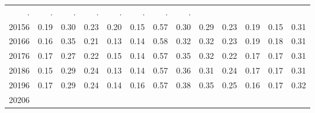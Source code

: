 \begin{table}[!h]
\begin{tabular}{lllllllllllll}
  \multicolumn{1}{r}{.} &
  \multicolumn{1}{r}{.} &
  \multicolumn{1}{r}{.} &
  \multicolumn{1}{r}{.} &
  \multicolumn{1}{r}{.} &
  \multicolumn{1}{r}{.} &
  \multicolumn{1}{r}{.} &
  \multicolumn{1}{r}{.} \\
\multicolumn{1}{l}{\hspace{1em}20156} &
  \multicolumn{1}{|r}{0.19} &
  \multicolumn{1}{r}{0.30} &
  \multicolumn{1}{r}{0.23} &
  \multicolumn{1}{r}{0.20} &
  \multicolumn{1}{r}{0.15} &
  \multicolumn{1}{r}{0.57} &
  \multicolumn{1}{r}{0.30} &
  \multicolumn{1}{r}{0.29} &
  \multicolumn{1}{r}{0.23} &
  \multicolumn{1}{r}{0.19} &
  \multicolumn{1}{r}{0.15} &
  \multicolumn{1}{r}{0.31} \\
\multicolumn{1}{l}{\hspace{1em}20166} &
  \multicolumn{1}{|r}{0.16} &
  \multicolumn{1}{r}{0.35} &
  \multicolumn{1}{r}{0.21} &
  \multicolumn{1}{r}{0.13} &
  \multicolumn{1}{r}{0.14} &
  \multicolumn{1}{r}{0.58} &
  \multicolumn{1}{r}{0.32} &
  \multicolumn{1}{r}{0.32} &
  \multicolumn{1}{r}{0.23} &
  \multicolumn{1}{r}{0.19} &
  \multicolumn{1}{r}{0.18} &
  \multicolumn{1}{r}{0.31} \\
\multicolumn{1}{l}{\hspace{1em}20176} &
  \multicolumn{1}{|r}{0.17} &
  \multicolumn{1}{r}{0.27} &
  \multicolumn{1}{r}{0.22} &
  \multicolumn{1}{r}{0.15} &
  \multicolumn{1}{r}{0.14} &
  \multicolumn{1}{r}{0.57} &
  \multicolumn{1}{r}{0.35} &
  \multicolumn{1}{r}{0.32} &
  \multicolumn{1}{r}{0.22} &
  \multicolumn{1}{r}{0.17} &
  \multicolumn{1}{r}{0.17} &
  \multicolumn{1}{r}{0.31} \\
\multicolumn{1}{l}{\hspace{1em}20186} &
  \multicolumn{1}{|r}{0.15} &
  \multicolumn{1}{r}{0.29} &
  \multicolumn{1}{r}{0.24} &
  \multicolumn{1}{r}{0.13} &
  \multicolumn{1}{r}{0.14} &
  \multicolumn{1}{r}{0.57} &
  \multicolumn{1}{r}{0.36} &
  \multicolumn{1}{r}{0.31} &
  \multicolumn{1}{r}{0.24} &
  \multicolumn{1}{r}{0.17} &
  \multicolumn{1}{r}{0.17} &
  \multicolumn{1}{r}{0.31} \\
\multicolumn{1}{l}{\hspace{1em}20196} &
  \multicolumn{1}{|r}{0.17} &
  \multicolumn{1}{r}{0.29} &
  \multicolumn{1}{r}{0.24} &
  \multicolumn{1}{r}{0.14} &
  \multicolumn{1}{r}{0.16} &
  \multicolumn{1}{r}{0.57} &
  \multicolumn{1}{r}{0.38} &
  \multicolumn{1}{r}{0.35} &
  \multicolumn{1}{r}{0.25} &
  \multicolumn{1}{r}{0.16} &
  \multicolumn{1}{r}{0.17} &
  \multicolumn{1}{r}{0.32} \\
\multicolumn{1}{l}{\hspace{1em}20206} &

\end{tabular}
\end{table}
